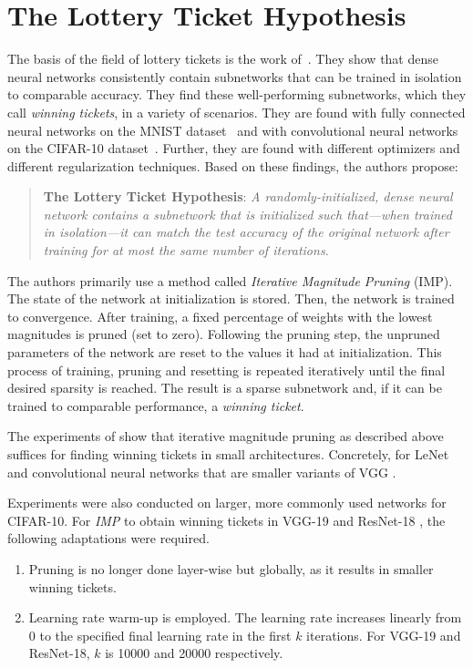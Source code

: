 \section{The Lottery Ticket Hypothesis}\label{sec:lth}
The basis of the field of lottery tickets is the work of~\cite{LTH}. 
They show that dense neural networks consistently contain subnetworks that can be trained in isolation to comparable accuracy.
They find these well-performing subnetworks, which they call \textit{winning tickets}, in a variety of scenarios.
They are found with fully connected neural networks on the MNIST dataset~\autocite{mnist} and with convolutional neural networks~\autocite{cnn} on the CIFAR-10 dataset~\autocite{cifar}.
Further, they are found with different optimizers and different regularization techniques.
Based on these findings, the authors propose:

\begin{quote}
\textbf{The Lottery Ticket Hypothesis}: \textit{A randomly-initialized, dense neural network contains a subnetwork that is initialized such that—when trained in isolation—it can match the test accuracy of the original network after training for at most the same number of iterations.}~\cite{LTH}
\end{quote}


The authors primarily use a method called \textit{Iterative Magnitude Pruning} (IMP).
The state of the network at initialization is stored.
Then, the network is trained to convergence. 
After training, a fixed percentage of weights with the lowest magnitudes is pruned (set to zero).
Following the pruning step, the unpruned parameters of the network are reset to the values it had at initialization.
This process of training, pruning and resetting is repeated iteratively until the final desired sparsity is reached.
The result is a sparse subnetwork and, if it can be trained to comparable performance,  a \textit{winning ticket}.

The experiments of \autocite{LTH} show that iterative magnitude pruning as described above suffices for finding winning tickets in small architectures.
Concretely, for LeNet \autocite{cnn} and convolutional neural networks that are smaller variants of VGG \autocite{SimonyanZisserman}.

Experiments were also conducted on larger, more commonly used networks for CIFAR-10. For \textit{IMP} to obtain winning tickets in VGG-19 \autocite{Liu19} and ResNet-18 \autocite{ResidualConnect}, the following adaptations were required. 
\begin{enumerate}
  \item  Pruning is no longer done layer-wise but globally, as it results in smaller winning tickets. 
  \item Learning rate warm-up is employed. The learning rate increases linearly from 0 to the specified final learning rate in the first $k$ iterations. For VGG-19 and ResNet-18, $k$ is 10000 and 20000 respectively.
\end{enumerate}

